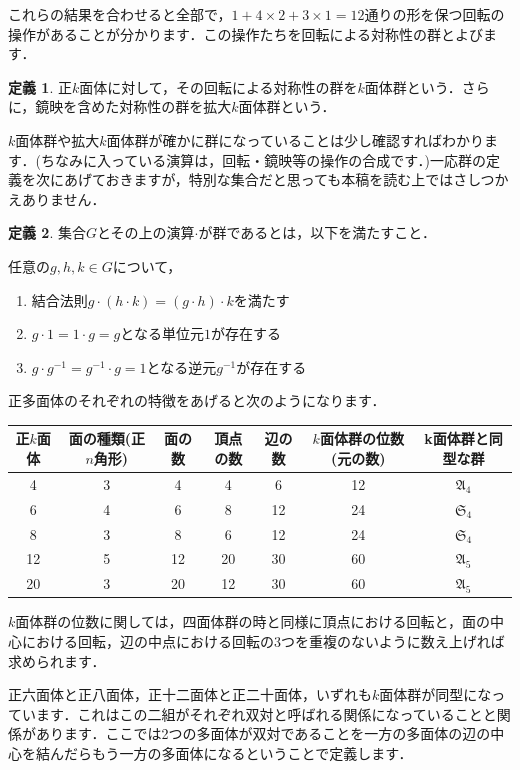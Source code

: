 \documentclass{jreport}
\theoremstyle{definition} %
\newtheorem{idefi}{定義}[section]
\begin{document}
これらの結果を合わせると全部で，$1+4\times2 +3 \times 1 =12$通りの形を保つ回転の操作があることが分かります．この操作たちを回転による対称性の群とよびます．
\begin{idefi}
  正$k$面体に対して，その回転による対称性の群を$k$面体群という．さらに，鏡映を含めた対称性の群を拡大$k$面体群という．
\end{idefi}
$k$面体群や拡大$k$面体群が確かに群になっていることは少し確認すればわかります．(ちなみに入っている演算は，回転・鏡映等の操作の合成です．)一応群の定義を次にあげておきますが，特別な集合だと思っても本稿を読む上ではさしつかえありません．
\begin{idefi}
  集合$G$とその上の演算$\cdot$が群であるとは，以下を満たすこと．
  
  任意の$g,h,k \in G$について，
  \begin{enumerate}
  \item 結合法則$g\cdot(h\cdot k)=(g\cdot h)\cdot k$を満たす
  \item $g\cdot 1=1 \cdot g=g$となる単位元$1$が存在する
  \item $g\cdot g^{-1}=g^{-1}\cdot g=1$となる逆元$g^{-1}$が存在する
  \end{enumerate}
\end{idefi}
正多面体のそれぞれの特徴をあげると次のようになります．

\begin{tabular}{|c||c|c|c|c|c|c|}\hline
  正$k$面体 & 面の種類(正$n$角形) & 面の数 & 頂点の数 & 辺の数 & $k$面体群の位数(元の数) & k面体群と同型な群\\\hline
  4 & 3 & 4 & 4 & 6 & 12 & $\mathfrak{A}_4$\\\hline 
  6 & 4 & 6 & 8 & 12 & 24 & $\mathfrak{S}_4$\\\hline 
  8 & 3 & 8 & 6 & 12 & 24 & $\mathfrak{S}_4$\\\hline 
  12 & 5 & 12 & 20 & 30 & 60 & $\mathfrak{A}_5$\\\hline 
  20 & 3 & 20 & 12 & 30 & 60 & $\mathfrak{A}_5$\\\hline 
\end{tabular}
$k$面体群の位数に関しては，四面体群の時と同様に頂点における回転と，面の中心における回転，辺の中点における回転の$3$つを重複のないように数え上げれば求められます．

正六面体と正八面体，正十二面体と正二十面体，いずれも$k$面体群が同型になっています．これはこの二組がそれぞれ双対と呼ばれる関係になっていることと関係があります．ここでは2つの多面体が双対であることを一方の多面体の辺の中心を結んだらもう一方の多面体になるということで定義します．
\end{document}
